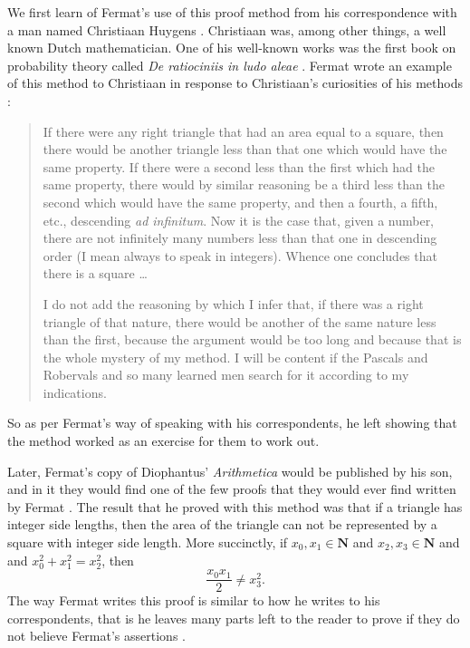 \documentclass[11pt]{article}
\begin{document}
We first learn of Fermat's use of this proof method from his correspondence
with a man named Christiaan Huygens \cite{Mahoney, Wirth}.
Christiaan was, among other things, a well known Dutch mathematician.
One of his well-known works was the first book
on probability theory called \emph{De ratiociniis in ludo aleae} \cite{Huygens}.
Fermat wrote an example of this method to Christiaan in response to Christiaan's
curiosities of his methods \cite{Mahoney}:

\begin{quotation}
    If there were any right triangle that had an area equal to a square,
    then there would be another triangle less than that one which would
    have the same property.
    If there were a second less than the first which had the same property,
    there would by similar reasoning be a third less than the second
    which would have the same property, and then a fourth, a fifth, etc.,
    descending \emph{ad infinitum}.
    Now it is the case that, given a number, there are not infinitely many
    numbers less than that one in descending order (I mean always to speak in
    integers). 
    Whence one concludes that there is a square \ldots

    I do not add the reasoning by which I infer that, if there was a right
    triangle of that nature, there would be another of the same nature less
    than the first, because the argument would be too long and because that is
    the whole mystery of my method.
    I will be content if the Pascals and Robervals and so many learned men
    search for it according to my indications.
\end{quotation}

So as per Fermat's way of speaking with his correspondents, he left showing that
the method worked as an exercise for them to work out.

Later, Fermat's copy of 
Diophantus' \emph{Arithmetica} would be published by his son,
and in it they would find one of the few proofs
that they would ever find written by Fermat \cite{Wirth}.
The result that he proved with this method was that if a triangle has integer
side lengths, then the area of the triangle can not be represented by a square
with integer side length.
More succinctly, if $x_0,x_1 \in \mathbf{N}$ and $x_2,x_3 \in \mathbf{N}$ and
and $x_0^2 + x_1^2 = x_2^2$, then \[\frac{x_0x_1}{2} \neq x_3^2. \]
The way Fermat writes this proof is similar to how he writes to his correspondents,
that is he leaves many parts left to the reader to prove if they do not believe
Fermat's assertions \cite{Wirth}.
\end{document}
